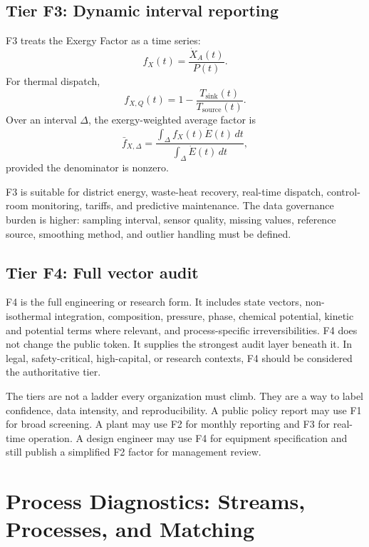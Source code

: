\documentclass[11pt]{article}
\newcommand{\fx}{f_X}
\newcommand{\XdotA}{\dot{X}_A}
\begin{document}
\subsection{Tier F3: Dynamic interval reporting}

F3 treats the Exergy Factor as a time series:
\begin{equation}
\fx(t)=\frac{\XdotA(t)}{P(t)}.
\end{equation}
For thermal dispatch,
\begin{equation}
f_{X,Q}(t)=1-\frac{T_{\mathrm{sink}}(t)}{T_{\mathrm{source}}(t)}.
\end{equation}
Over an interval $\Delta$, the exergy-weighted average factor is
\begin{equation}
\bar{f}_{X,\Delta}=\frac{\int_{\Delta}\fx(t)\dot{E}(t)\,dt}{\int_{\Delta}\dot{E}(t)\,dt},
\end{equation}
provided the denominator is nonzero.

F3 is suitable for district energy, waste-heat recovery, real-time dispatch, control-room monitoring, tariffs, and predictive maintenance. The data governance burden is higher: sampling interval, sensor quality, missing values, reference source, smoothing method, and outlier handling must be defined.

\subsection{Tier F4: Full vector audit}

F4 is the full engineering or research form. It includes state vectors, non-isothermal integration, composition, pressure, phase, chemical potential, kinetic and potential terms where relevant, and process-specific irreversibilities. F4 does not change the public token. It supplies the strongest audit layer beneath it. In legal, safety-critical, high-capital, or research contexts, F4 should be considered the authoritative tier.

The tiers are not a ladder every organization must climb. They are a way to label confidence, data intensity, and reproducibility. A public policy report may use F1 for broad screening. A plant may use F2 for monthly reporting and F3 for real-time operation. A design engineer may use F4 for equipment specification and still publish a simplified F2 factor for management review.

\section{Process Diagnostics: Streams, Processes, and Matching}
\end{document}
